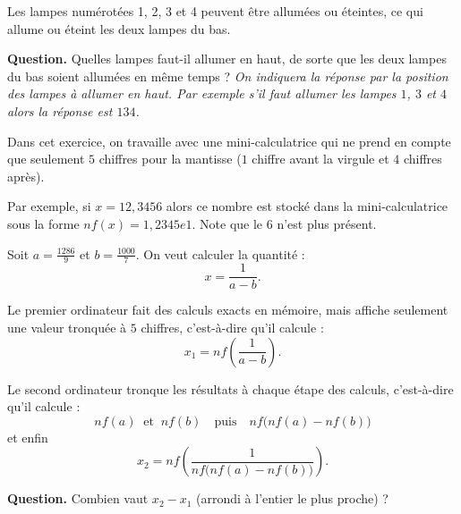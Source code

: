 \documentclass[class=report,crop=false, 12pt]{standalone}
\begin{document}


\begin{enigme}

Les lampes numérotées 1, 2, 3 et 4 peuvent être allumées ou éteintes, ce qui allume ou éteint les deux lampes du bas.

 
\bigskip

\textbf{Question.} Quelles lampes faut-il allumer en haut, de sorte que les deux lampes du bas soient allumées en même temps ?
\emph{On indiquera la réponse par la position des lampes à allumer en haut. Par exemple s'il faut allumer les lampes $1$, $3$ et $4$ alors la réponse est $134$.}


\end{enigme}


\begin{enigme}

Dans cet exercice, on travaille avec une mini-calculatrice qui ne prend en compte que seulement $5$ chiffres pour la mantisse ($1$ chiffre avant la virgule et $4$ chiffres après).  

Par exemple, si $x = 12,3456$ alors ce nombre est stocké dans la mini-calculatrice sous la forme $nf(x) = 1,2345e1$. Note que le $6$ n'est plus présent.
 
\bigskip

Soit $a = \frac{1286}{9}$ et $b = \frac{1000}{7}$.
On veut calculer la quantité :
$$x = \frac{1}{a-b}.$$

Le premier ordinateur fait des calculs exacts en mémoire, mais affiche seulement une valeur tronquée à $5$ chiffres, c'est-à-dire qu'il calcule :
$$x_1 = nf\left( \frac{1}{a-b} \right).$$

Le second ordinateur tronque les résultats à chaque étape des calculs, c'est-à-dire qu'il calcule :
$$nf(a) \  \text{ et } \  nf(b) \quad \text{puis} \quad 
nf\big( nf(a) - nf(b) \big)$$
et enfin 
$$x_2 = nf \left( \frac{1}{nf\big( nf(a) - nf(b) \big)}\right).$$


\textbf{Question.} Combien vaut $x_2-x_1$ (arrondi à l'entier le plus proche) ?

%
%

\end{enigme}
\end{document}
